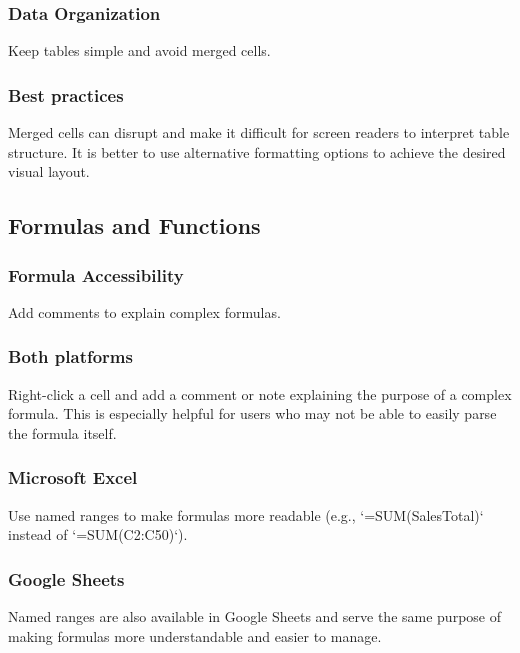 \subsubsection{Data Organization}\label{ch15:sssec:data-org}
Keep tables simple and avoid merged cells.

\subsubsection{Best practices}\label{ch15:sssec:data-org-best-practices}
Merged cells can disrupt  and make it difficult for screen readers to interpret table structure. It is better to use alternative formatting options to achieve the desired visual layout.

\subsection{Formulas and Functions}\label{ch15:ssec:formulas-functions}

\subsubsection{Formula Accessibility}\label{ch15:sssec:formula-accessibility}
Add comments to explain complex formulas.

\subsubsection{Both platforms}\label{ch15:sssec:formula-accessibility-both}
Right-click a cell and add a comment or note explaining the purpose of a complex formula. This is especially helpful for users who may not be able to easily parse the formula itself.

\subsubsection{Microsoft Excel}\label{ch15:sssec:excel-formulas}
Use named ranges to make formulas more readable (e.g., `=SUM(SalesTotal)` instead of `=SUM(C2:C50)`).

\subsubsection{Google Sheets}\label{ch15:sssec:sheets-formulas}
Named ranges are also available in Google Sheets and serve the same purpose of making formulas more understandable and easier to manage.

